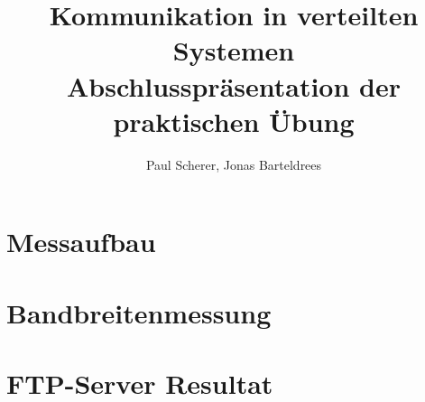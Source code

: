 \documentclass{beamer}
\title[KivS Abschlusspräsentation]{Kommunikation in verteilten Systemen\\Abschlusspräsentation der praktischen Übung}
\author{Paul Scherer, Jonas Barteldrees}
\institute[Institut für Informatik]{Universität Bonn, Institut für Informatik}
\begin{document}
\frame{
	\maketitle
}


\section{Messaufbau}

\section{Bandbreitenmessung}

\section{FTP-Server Resultat}
\end{document}
